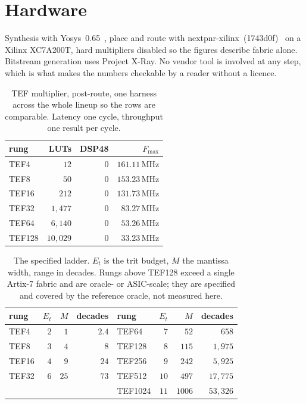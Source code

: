 \documentclass[11pt]{article}
\theoremstyle{definition}
\begin{document}
\section{Hardware}\label{sec:hardware}

Synthesis with Yosys~0.65~\cite{yosys}, place and route with
nextpnr-xilinx~(1743d0f)~\cite{nextpnr} on a
Xilinx XC7A200T, hard multipliers disabled so the figures describe fabric alone.
Bitstream generation uses Project X-Ray. No vendor tool is involved at any step,
which is what makes the numbers checkable by a reader without a licence.

\begin{table}[t]\centering
\caption{TEF multiplier, post-route, one harness across the whole lineup so the
rows are comparable. Latency one cycle, throughput one result per cycle.}
\label{tab:ladder}
\begin{tabular}{lrrr}
\toprule
rung & LUTs & DSP48 & $F_{\max}$ \\
\midrule
TEF4  & $12$      & $0$ & $161.11$\,MHz \\
TEF8  & $50$      & $0$ & $153.23$\,MHz \\
TEF16 & $212$     & $0$ & $131.73$\,MHz \\
TEF32  & $1{,}477$  & $0$ & $83.27$\,MHz \\
TEF64  & $6{,}140$  & $0$ & $53.26$\,MHz \\
TEF128 & $10{,}029$ & $0$ & $33.23$\,MHz \\
\bottomrule
\end{tabular}
\end{table}

\begin{table}[t]\centering
\caption{The specified ladder. $E_t$ is the trit budget, $M$ the mantissa width,
range in decades. Rungs above TEF128 exceed a single Artix-7 fabric and are
oracle- or ASIC-scale; they are specified and covered by the reference oracle,
not measured here.}
\label{tab:spec}
\begin{tabular}{lrrr@{\hskip 2em}lrrr}
\toprule
rung & $E_t$ & $M$ & decades & rung & $E_t$ & $M$ & decades \\
\midrule
TEF4  & $2$ & $1$  & $2.4$ & TEF64   & $7$  & $52$   & $658$ \\
TEF8  & $3$ & $4$  & $8$   & TEF128  & $8$  & $115$  & $1{,}975$ \\
TEF16 & $4$ & $9$  & $24$  & TEF256  & $9$  & $242$  & $5{,}925$ \\
TEF32 & $6$ & $25$ & $73$  & TEF512  & $10$ & $497$  & $17{,}775$ \\
       &     &      &       & TEF1024 & $11$ & $1006$ & $53{,}326$ \\
\bottomrule
\end{tabular}
\end{table}
\end{document}
